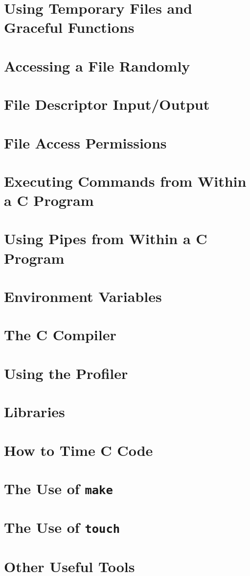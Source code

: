 \documentclass[12pt]{book}
\begin{document}
\section{Using Temporary Files and Graceful Functions}
\section{Accessing a File Randomly}
\section{File Descriptor Input/Output}
\section{File Access Permissions}
\section{Executing Commands from Within a C Program}
\section{Using Pipes from Within a C Program}
\section{Environment Variables}
\section{The C Compiler}
\section{Using the Profiler}
\section{Libraries}
\section{How to Time C Code}
\section{The Use of \texttt{make}}
\section{The Use of \texttt{touch}}
\section{Other Useful Tools}
\end{document}
